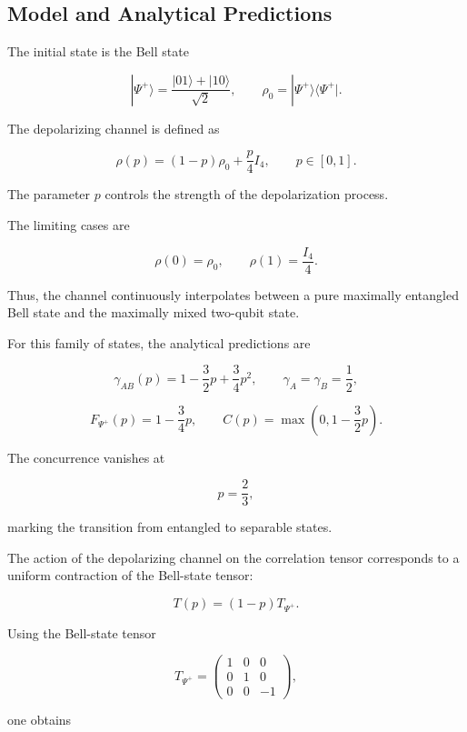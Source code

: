 \subsection*{Model and Analytical Predictions}

The initial state is the Bell state

\[
|\Psi^+\rangle
=
\frac{|01\rangle + |10\rangle}{\sqrt{2}},
\qquad
\rho_0
=
|\Psi^+\rangle
\langle\Psi^+|.
\]

The depolarizing channel is defined as

\begin{equation}
\rho(p)
=
(1-p)\rho_0
+
\frac{p}{4}I_4,
\qquad
p \in [0,1].
\label{eq:depolarizing_channel_experiment}
\end{equation}

The parameter \(p\) controls the strength of the depolarization process.

The limiting cases are

\[
\rho(0)
=
\rho_0,
\qquad
\rho(1)
=
\frac{I_4}{4}.
\]

Thus, the channel continuously interpolates between a pure maximally entangled Bell state and the maximally mixed two-qubit state.

\medskip

For this family of states, the analytical predictions are

\[
\gamma_{AB}(p)
=
1
-
\frac{3}{2}p
+
\frac{3}{4}p^2,
\qquad
\gamma_A
=
\gamma_B
=
\frac{1}{2},
\]

\[
F_{\Psi^+}(p)
=
1
-
\frac{3}{4}p,
\qquad
C(p)
=
\max
\left(
0,
1-\frac{3}{2}p
\right).
\]

The concurrence vanishes at

\[
p
=
\frac{2}{3},
\]

marking the transition from entangled to separable states.

\medskip

The action of the depolarizing channel on the correlation tensor corresponds to a uniform contraction of the Bell-state tensor:

\[
T(p)
=
(1-p)
T_{\Psi^+}.
\]

Using the Bell-state tensor

\[
T_{\Psi^+}
=
\begin{pmatrix}
1 & 0 & 0 \\
0 & 1 & 0 \\
0 & 0 & -1
\end{pmatrix},
\]

one obtains

